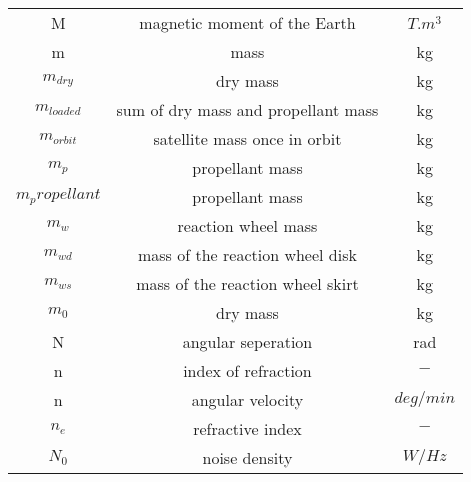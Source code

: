 \begin{center}
\begin{longtable}{c|c|c}
M                                   & magnetic moment of the Earth                 														& $T.m^3$ \\

m 																	& mass 																																		& kg \\

$m_{dry}$                           & dry mass                                    														& kg \\

$m_{loaded}$												& sum of dry mass and propellant mass																			& kg \\

$m_{orbit}$                         & satellite mass once in orbit                														& kg \\

$m_p$								    						& propellant mass 																												& kg \\

$m_propellant$ 											& propellant mass 																												& kg \\

$m_w$                               & reaction wheel mass  																										& kg \\

$m_{wd}$                            & mass of the reaction wheel disk  																				& kg \\

$m_{ws}$                            & mass of the reaction wheel skirt 																				& kg \\

$m_0$                               & dry mass                         																				& kg \\

N 																	& angular seperation 																											& rad \\

n 																	& index of refraction																											& $-$ \\

n                                		& angular velocity                             														& $deg/{min}$ \\

$n_e$ 															& refractive index 																												& $-$ \\

$N_0$                           		& noise density                                														& $W/Hz$ \\


\end{longtable}
\end{center}
